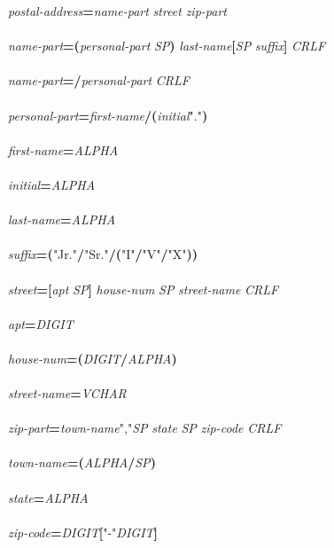 \documentclass{article}
\renewcommand{\textsuperscript}[1]{\raisebox{0.8ex}{#1}}
\begin{document}
{\scriptsize\ttfamily
\emph{postal-{}address}\textbf{=}\emph{name-{}part} \emph{street} \emph{zip-{}part}\\
\\
\emph{name-{}part}\textbf{=}\textcolor{teal}{\emph{\textsuperscript{*}}}\textbf{(}\emph{personal-{}part} \emph{SP}\textbf{)} \emph{last-{}name}\textbf{[}\emph{SP} \emph{suffix}\textbf{]} \emph{CRLF}\\
\\
\emph{name-{}part}\textbf{=/}\emph{personal-{}part} \emph{CRLF}\\
\\
\emph{personal-{}part}\textbf{=}\emph{first-{}name}\textbf{/}\textbf{(}\emph{initial}\textcolor{BrickRed}{"."}\textbf{)}\\
\\
\emph{first-{}name}\textbf{=}\textcolor{teal}{\emph{\textsuperscript{*}}}\emph{ALPHA}\\
\\
\emph{initial}\textbf{=}\emph{ALPHA}\\
\\
\emph{last-{}name}\textbf{=}\textcolor{teal}{\emph{\textsuperscript{*}}}\emph{ALPHA}\\
\\
\emph{suffix}\textbf{=}\textbf{(}\textcolor{BrickRed}{"Jr."}\textbf{/}\textcolor{BrickRed}{"Sr."}\textbf{/}\textcolor{teal}{\emph{\textsuperscript{1*}}}\textbf{(}\textcolor{BrickRed}{"I"}\textbf{/}\textcolor{BrickRed}{"V"}\textbf{/}\textcolor{BrickRed}{"X"}\textbf{)}\textbf{)}\\
\\
\emph{street}\textbf{=}\textbf{[}\emph{apt} \emph{SP}\textbf{]} \emph{house-{}num} \emph{SP} \emph{street-{}name} \emph{CRLF}\\
\\
\emph{apt}\textbf{=}\textcolor{teal}{\emph{\textsuperscript{1*4}}}\emph{DIGIT}\\
\\
\emph{house-{}num}\textbf{=}\textcolor{teal}{\emph{\textsuperscript{1*8}}}\textbf{(}\emph{DIGIT}\textbf{/}\emph{ALPHA}\textbf{)}\\
\\
\emph{street-{}name}\textbf{=}\textcolor{teal}{\emph{\textsuperscript{1*}}}\emph{VCHAR}\\
\\
\emph{zip-{}part}\textbf{=}\emph{town-{}name}\textcolor{BrickRed}{","}\emph{SP} \emph{state} \textcolor{teal}{\emph{\textsuperscript{1*2}}}\emph{SP} \emph{zip-{}code} \emph{CRLF}\\
\\
\emph{town-{}name}\textbf{=}\textcolor{teal}{\emph{\textsuperscript{1*}}}\textbf{(}\emph{ALPHA}\textbf{/}\emph{SP}\textbf{)}\\
\\
\emph{state}\textbf{=}\textcolor{teal}{\emph{\textsuperscript{2}}}\emph{ALPHA}\\
\\
\emph{zip-{}code}\textbf{=}\textcolor{teal}{\emph{\textsuperscript{5}}}\emph{DIGIT}\textbf{[}\textcolor{BrickRed}{"-{}"}\textcolor{teal}{\emph{\textsuperscript{4}}}\emph{DIGIT}\textbf{]}\\

}
\end{document}
